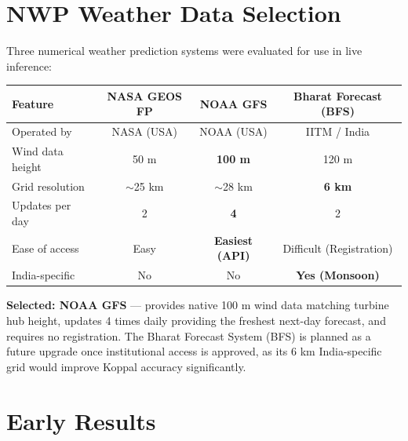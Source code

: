 \documentclass[11pt,a4paper]{article}
\begin{document}
\vspace{0.5cm}

\section{NWP Weather Data Selection}

Three numerical weather prediction systems were evaluated for use in live inference:

\begin{center}
\begin{tabular}{lccc}
  \toprule
  \textbf{Feature}    & \textbf{NASA GEOS FP} & \textbf{NOAA GFS}         & \textbf{Bharat Forecast (BFS)} \\
  \midrule
  Operated by         & NASA (USA)            & NOAA (USA)                & IITM / India            \\
  Wind data height    & 50 m                  & \textbf{100 m}            & 120 m                   \\
  Grid resolution     & $\sim$25 km           & $\sim$28 km               & \textbf{6 km}           \\
  Updates per day     & 2                     & \textbf{4}                & 2                       \\
  Ease of access      & Easy                  & \textbf{Easiest (API)}    & Difficult (Registration)\\
  India-specific      & No                    & No                        & \textbf{Yes (Monsoon)}  \\
  \bottomrule
\end{tabular}
\end{center}

\vspace{0.3cm}
\noindent\textbf{Selected: NOAA GFS} --- provides native 100 m wind data matching turbine hub height, updates 4 times daily providing the freshest next-day forecast, and requires no registration. The Bharat Forecast System (BFS) is planned as a future upgrade once institutional access is approved, as its 6 km India-specific grid would improve Koppal accuracy significantly.

\section{Early Results}
\end{document}
